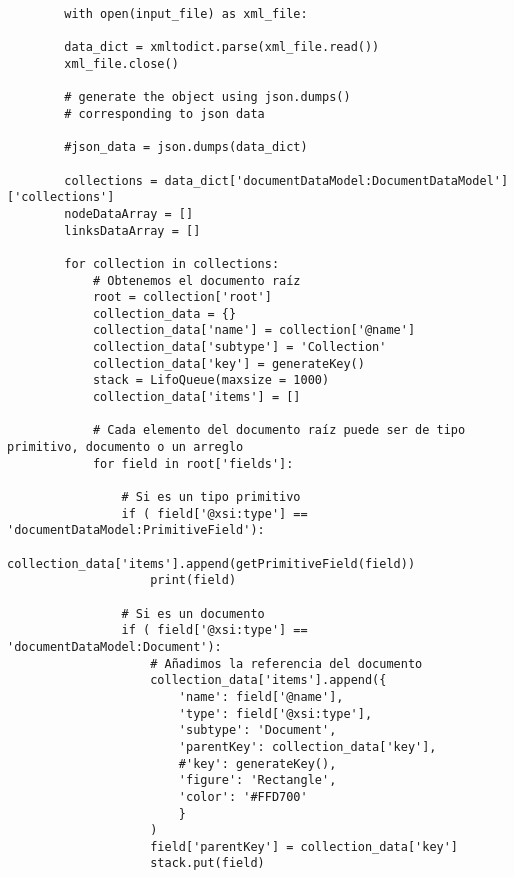 \begin{code}
    \label{code:ddm-to-gojs}
    \begin{verbatim}
        with open(input_file) as xml_file: 
      
        data_dict = xmltodict.parse(xml_file.read()) 
        xml_file.close() 
      
        # generate the object using json.dumps()  
        # corresponding to json data 
          
        #json_data = json.dumps(data_dict) 
    
        collections = data_dict['documentDataModel:DocumentDataModel']['collections']
        nodeDataArray = []
        linksDataArray = []
    
        for collection in collections:
            # Obtenemos el documento raíz
            root = collection['root']
            collection_data = {}
            collection_data['name'] = collection['@name'] 
            collection_data['subtype'] = 'Collection' 
            collection_data['key'] = generateKey()
            stack = LifoQueue(maxsize = 1000)
            collection_data['items'] = []
            
            # Cada elemento del documento raíz puede ser de tipo primitivo, documento o un arreglo
            for field in root['fields']:
                
                # Si es un tipo primitivo
                if ( field['@xsi:type'] == 'documentDataModel:PrimitiveField'):
                    collection_data['items'].append(getPrimitiveField(field))
                    print(field)
    
                # Si es un documento
                if ( field['@xsi:type'] == 'documentDataModel:Document'):
                    # Añadimos la referencia del documento
                    collection_data['items'].append({ 
                        'name': field['@name'],
                        'type': field['@xsi:type'],
                        'subtype': 'Document',
                        'parentKey': collection_data['key'], 
                        #'key': generateKey(),
                        'figure': 'Rectangle',
                        'color': '#FFD700'
                        }
                    )
                    field['parentKey'] = collection_data['key']
                    stack.put(field)
                    

\end{verbatim}
\end{code}
